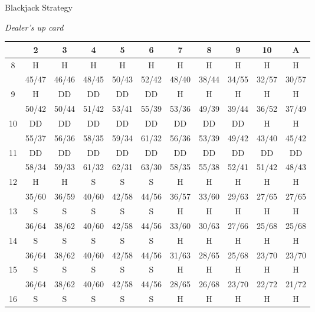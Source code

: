 \documentclass{article}
\begin{document}
\begin{center}
\begin{large}
Blackjack Strategy
\end{large}
\end{center}

\begin{small}
\begin{center}
\emph{Dealer's up card}
\end{center}

\begin{tabular}{c|c|c|c|c|c|c|c|c|c|c|}
& 2 & 3 & 4 & 5 & 6 & 7 & 8 & 9 & 10 & A \\
\hline
8  & H  & H  & H  & H  & H  & H  & H  & H  & H  & H \\
 & 45/47  & 46/46  & 48/45  & 50/43  & 52/42  & 48/40  & 38/44  & 34/55  & 32/57  & 30/57 \\
\hline
9  & H  & DD  & DD  & DD  & DD  & H  & H  & H  & H  & H \\
 & 50/42  & 50/44  & 51/42  & 53/41  & 55/39  & 53/36  & 49/39  & 39/44  & 36/52  & 37/49 \\
\hline
10  & DD  & DD  & DD  & DD  & DD  & DD  & DD  & DD  & H  & H \\
 & 55/37  & 56/36  & 58/35  & 59/34  & 61/32  & 56/36  & 53/39  & 49/42  & 43/40  & 45/42 \\
\hline
11  & DD  & DD  & DD  & DD  & DD  & DD  & DD  & DD  & DD  & DD \\
 & 58/34  & 59/33  & 61/32  & 62/31  & 63/30  & 58/35  & 55/38  & 52/41  & 51/42  & 48/43 \\
\hline
12  & H  & H  & S  & S  & S  & H  & H  & H  & H  & H \\
 & 35/60  & 36/59  & 40/60  & 42/58  & 44/56  & 36/57  & 33/60  & 29/63  & 27/65  & 27/65 \\
\hline
13  & S  & S  & S  & S  & S  & H  & H  & H  & H  & H \\
 & 36/64  & 38/62  & 40/60  & 42/58  & 44/56  & 33/60  & 30/63  & 27/66  & 25/68  & 25/68 \\
\hline
14  & S  & S  & S  & S  & S  & H  & H  & H  & H  & H \\
 & 36/64  & 38/62  & 40/60  & 42/58  & 44/56  & 31/63  & 28/65  & 25/68  & 23/70  & 23/70 \\
\hline
15  & S  & S  & S  & S  & S  & H  & H  & H  & H  & H \\
 & 36/64  & 38/62  & 40/60  & 42/58  & 44/56  & 28/65  & 26/68  & 23/70  & 22/72  & 21/72 \\
\hline
16  & S  & S  & S  & S  & S  & H  & H  & H  & H  & H \\

\end{tabular}
\end{small}
\end{document}
